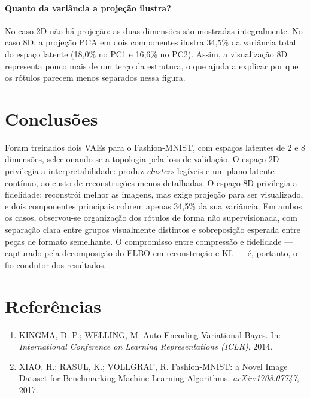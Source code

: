 \documentclass[11pt,a4paper]{article}
\begin{document}
\paragraph{Quanto da variância a projeção ilustra?}
No caso 2D não há projeção: as duas dimensões são mostradas integralmente. No
caso 8D, a projeção PCA em dois componentes ilustra 34,5\% da variância total do
espaço latente (18,0\% no PC1 e 16,6\% no PC2). Assim, a visualização 8D
representa pouco mais de um terço da estrutura, o que ajuda a explicar por que os
rótulos parecem menos separados nessa figura.

\section{Conclusões}

Foram treinados dois VAEs para o Fashion-MNIST, com espaços latentes de 2 e 8
dimensões, selecionando-se a topologia pela loss de validação. O espaço 2D
privilegia a interpretabilidade: produz \textit{clusters} legíveis e um plano
latente contínuo, ao custo de reconstruções menos detalhadas. O espaço 8D
privilegia a fidelidade: reconstrói melhor as imagens, mas exige projeção para
ser visualizado, e dois componentes principais cobrem apenas 34,5\% da sua
variância. Em ambos os casos, observou-se organização dos rótulos de forma não
supervisionada, com separação clara entre grupos visualmente distintos e
sobreposição esperada entre peças de formato semelhante. O compromisso entre
compressão e fidelidade --- capturado pela decomposição do ELBO em reconstrução
e KL --- é, portanto, o fio condutor dos resultados.

\section*{Referências}

\begin{enumerate}
\item KINGMA, D. P.; WELLING, M. Auto-Encoding Variational Bayes. In:
\textit{International Conference on Learning Representations (ICLR)}, 2014.
\item XIAO, H.; RASUL, K.; VOLLGRAF, R. Fashion-MNIST: a Novel Image Dataset for
Benchmarking Machine Learning Algorithms. \textit{arXiv:1708.07747}, 2017.
\end{enumerate}
\end{document}
